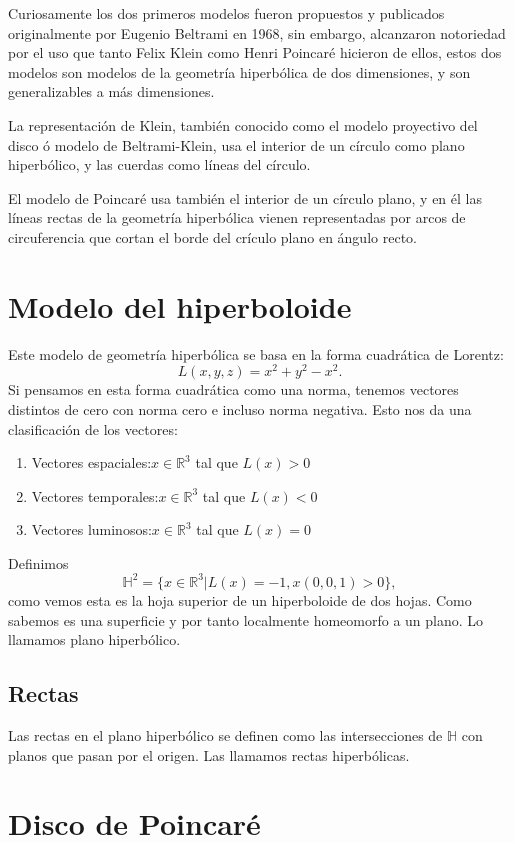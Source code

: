 \documentclass{article}
\theoremstyle{plain}
\theoremstyle{definition}
\theoremstyle{remark}
\begin{document}
Curiosamente los dos primeros modelos fueron propuestos y publicados
originalmente por Eugenio Beltrami en 1968, sin embargo, alcanzaron
notoriedad por el uso que tanto Felix Klein como Henri Poincaré
hicieron de ellos, estos dos modelos son modelos de la geometría
hiperbólica de dos dimensiones, y son generalizables a más
dimensiones.

La representación de Klein, también conocido como el modelo proyectivo
del disco ó modelo de Beltrami-Klein, usa el interior de un círculo
como plano hiperbólico, y las cuerdas como líneas del círculo.

El modelo de Poincaré usa también el interior de un círculo plano, y
en él las líneas rectas de la geometría hiperbólica vienen
representadas por arcos de circuferencia que cortan el borde del
crículo plano en ángulo recto.

\section{Modelo del hiperboloide}

Este modelo de geometría hiperbólica se basa en la forma cuadrática de
Lorentz: $$L(x,y,z)=x^2+y^2-x^2.$$ Si pensamos en esta forma
cuadrática como una norma, tenemos vectores distintos de cero con
norma cero e incluso norma negativa. Esto nos da una clasificación de
los vectores: \begin{enumerate}
\item{Vectores espaciales:$x\in\mathbb{R}^3$ tal que $L(x)>0$}
\item{Vectores temporales:$x\in\mathbb{R}^3$ tal que $L(x)<0$}
\item{Vectores luminosos:$x\in\mathbb{R}^3$ tal que $L(x)=0$}
 \end{enumerate}

 Definimos $$\mathbb{H}^2=\{x\in\mathbb{R}^3 | L(x)=-1,x(0,0,1)>0\},$$
 como vemos esta es la hoja superior de un hiperboloide de dos
 hojas. Como sabemos es una superficie y por tanto localmente
 homeomorfo a un plano. Lo llamamos plano hiperbólico.

\subsection{Rectas}

Las rectas en el plano hiperbólico se definen como las intersecciones
de $\mathbb{H}$ con planos que pasan por el origen. Las llamamos
rectas hiperbólicas.

\section{Disco de Poincaré}
\end{document}
